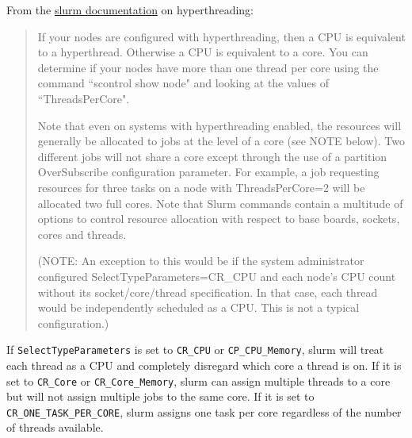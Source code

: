 
From the \href{https://slurm.schedmd.com/faq.html}{slurm documentation} on hyperthreading:
  \begin{quotation}
    If your nodes are configured with hyperthreading, then a CPU is equivalent to a hyperthread. Otherwise a CPU is equivalent to a core. You can determine if your nodes have more than one thread per core using the command ``scontrol show node" and looking at the values of ``ThreadsPerCore".

    Note that even on systems with hyperthreading enabled, the resources will generally be allocated to jobs at the level of a core (see NOTE below). Two different jobs will not share a core except through the use of a partition OverSubscribe configuration parameter. For example, a job requesting resources for three tasks on a node with ThreadsPerCore=2 will be allocated two full cores. Note that Slurm commands contain a multitude of options to control resource allocation with respect to base boards, sockets, cores and threads.

    (NOTE: An exception to this would be if the system administrator configured SelectTypeParameters=CR\_CPU and each node's CPU count without its socket/core/thread specification. In that case, each thread would be independently scheduled as a CPU. This is not a typical configuration.)
  \end{quotation}

If \texttt{SelectTypeParameters} is set to \texttt{CR\_CPU} or \texttt{CP\_CPU\_Memory}, slurm will treat each thread as a CPU and completely disregard which core a thread is on. If it is set to \texttt{CR\_Core} or \texttt{CR\_Core\_Memory}, slurm can assign multiple threads to a core but will not assign multiple jobs to the same core. If it is set to \texttt{CR\_ONE\_TASK\_PER\_CORE}, slurm assigns one task per core regardless of the number of threads available. 

%
%
%
%
%

